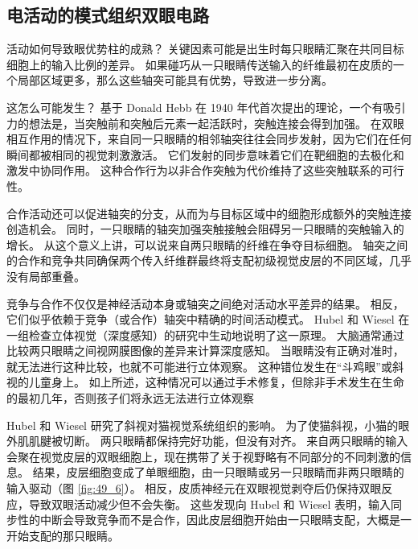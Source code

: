 \subsection{电活动的模式组织双眼电路}

活动如何导致眼优势柱的成熟？
关键因素可能是出生时每只眼睛汇聚在共同目标细胞上的输入比例的差异。
如果碰巧从一只眼睛传送输入的纤维最初在皮质的一个局部区域更多，那么这些轴突可能具有优势，导致进一步分离。


这怎么可能发生？
基于 Donald Hebb 在 1940 年代首次提出的理论，一个有吸引力的想法是，当突触前和突触后元素一起活跃时，突触连接会得到加强。
在双眼相互作用的情况下，来自同一只眼睛的相邻轴突往往会同步发射，因为它们在任何瞬间都被相同的视觉刺激激活。
它们发射的同步意味着它们在靶细胞的去极化和激发中协同作用。
这种合作行为以非合作突触为代价维持了这些突触联系的可行性。


合作活动还可以促进轴突的分支，从而为与目标区域中的细胞形成额外的突触连接创造机会。
同时，一只眼睛的轴突加强突触接触会阻碍另一只眼睛的突触输入的增长。
从这个意义上讲，可以说来自两只眼睛的纤维在争夺目标细胞。
轴突之间的合作和竞争共同确保两个传入纤维群最终将支配初级视觉皮层的不同区域，几乎没有局部重叠。


竞争与合作不仅仅是神经活动本身或轴突之间绝对活动水平差异的结果。
相反，它们似乎依赖于竞争（或合作）轴突中精确的时间活动模式。
Hubel 和 Wiesel 在一组检查立体视觉（深度感知）的研究中生动地说明了这一原理。
大脑通常通过比较两只眼睛之间视网膜图像的差异来计算深度感知。
当眼睛没有正确对准时，就无法进行这种比较，也就不可能进行立体观察。
这种错位发生在“斗鸡眼”或斜视的儿童身上。
如上所述，这种情况可以通过手术修复，但除非手术发生在生命的最初几年，否则孩子们将永远无法进行立体观察


Hubel 和 Wiesel 研究了斜视对猫视觉系统组织的影响。
为了使猫斜视，小猫的眼外肌肌腱被切断。 两只眼睛都保持完好功能，但没有对齐。
来自两只眼睛的输入会聚在视觉皮层的双眼细胞上，现在携带了关于视野略有不同部分的不同刺激的信息。
结果，皮层细胞变成了单眼细胞，由一只眼睛或另一只眼睛而非两只眼睛的输入驱动（图 \ref{fig:49_6}）。 
相反，皮质神经元在双眼视觉剥夺后仍保持双眼反应，导致双眼活动减少但不会失衡。
这些发现向 Hubel 和 Wiesel 表明，输入同步性的中断会导致竞争而不是合作，因此皮层细胞开始由一只眼睛支配，大概是一开始支配的那只眼睛。


